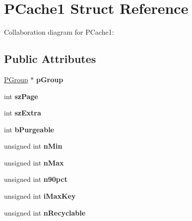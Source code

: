 \hypertarget{struct_p_cache1}{\section{P\+Cache1 Struct Reference}
\label{struct_p_cache1}
}


Collaboration diagram for P\+Cache1\+:
\subsection*{Public Attributes}
\begin{DoxyCompactItemize}
\item 
\hypertarget{struct_p_cache1_ae3389f0c68d6946a1eebeeee835ece69}{\hyperlink{struct_p_group}{P\+Group} $\ast$ {\bfseries p\+Group}}\label{struct_p_cache1_ae3389f0c68d6946a1eebeeee835ece69}

\item 
\hypertarget{struct_p_cache1_a1425039a858b7518c097d8ae92597de0}{int {\bfseries sz\+Page}}\label{struct_p_cache1_a1425039a858b7518c097d8ae92597de0}

\item 
\hypertarget{struct_p_cache1_a1e96e6671732e0af641732991b681ede}{int {\bfseries sz\+Extra}}\label{struct_p_cache1_a1e96e6671732e0af641732991b681ede}

\item 
\hypertarget{struct_p_cache1_a2af7d24e27369252addec9bef45afcfc}{int {\bfseries b\+Purgeable}}\label{struct_p_cache1_a2af7d24e27369252addec9bef45afcfc}

\item 
\hypertarget{struct_p_cache1_a9e96c79ec60c2e368f92a2ba52d01c44}{unsigned int {\bfseries n\+Min}}\label{struct_p_cache1_a9e96c79ec60c2e368f92a2ba52d01c44}

\item 
\hypertarget{struct_p_cache1_aef08139a0b86b0c0a7ee2bec0bab2405}{unsigned int {\bfseries n\+Max}}\label{struct_p_cache1_aef08139a0b86b0c0a7ee2bec0bab2405}

\item 
\hypertarget{struct_p_cache1_a8a5c5ab7d71e66c2a4df3f22513888f0}{unsigned int {\bfseries n90pct}}\label{struct_p_cache1_a8a5c5ab7d71e66c2a4df3f22513888f0}

\item 
\hypertarget{struct_p_cache1_a2dff616ad2d1873ad3a8d20d53bcb4d0}{unsigned int {\bfseries i\+Max\+Key}}\label{struct_p_cache1_a2dff616ad2d1873ad3a8d20d53bcb4d0}

\item 
\hypertarget{struct_p_cache1_a3501394bd251f08d1f9d26d3b2d4c67c}{unsigned int {\bfseries n\+Recyclable}}\label{struct_p_cache1_a3501394bd251f08d1f9d26d3b2d4c67c}


\end{DoxyCompactItemize}
